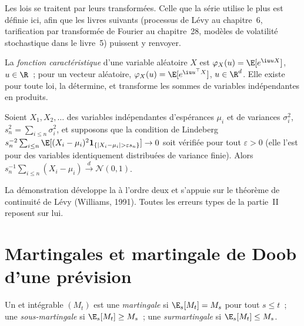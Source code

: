 Les lois se traitent par leurs transformées. Celle que la série utilise le plus est définie ici, afin
que les livres suivants (processus de Lévy au chapitre~6, tarification par transformée de Fourier au chapitre~28, modèles de volatilité
stochastique dans le livre~5) puissent y renvoyer.

\begin{definition}\label{def:qm:probability-at-speed:charfn}
La \emph{fonction caractéristique} d'une variable aléatoire $X$
est $\varphi_X(u) = \E[e^{\iu uX}]$, $u \in \R$~; pour un vecteur aléatoire, $\varphi_X(u) =
\E[e^{\iu u^\top X}]$, $u \in \R^d$. Elle existe pour toute loi, la détermine, et transforme les sommes
de variables indépendantes en produits.
\end{definition}

\begin{theorem}\label{thm:qm:probability-at-speed:clt}
Soient $X_1, X_2, \dots$ des variables indépendantes d'espérances $\mu_i$ et de variances $\sigma_i^2$, $s_n^2 =
\sum_{i \le n}\sigma_i^2$, et supposons que la condition de Lindeberg $s_n^{-2}\sum_{i\le n}\E[(X_i -
\mu_i)^2\mathbf 1_{\{|X_i - \mu_i| > \varepsilon s_n\}}] \to 0$ soit vérifiée pour tout $\varepsilon >
0$ (elle l'est pour des variables identiquement distribuées de variance finie). Alors
$s_n^{-1}\sum_{i \le n}(X_i - \mu_i) \xrightarrow{d} \mathcal N(0, 1)$.
\end{theorem}

\admitted

La démonstration développe la  à l'ordre deux et s'appuie sur le
théorème de continuité de Lévy (Williams, 1991). Toutes les erreurs types de la partie~II reposent sur lui.

\section{Martingales et martingale de Doob d'une prévision}

\begin{definition}[Martingale]\label{def:qm:probability-at-speed:martingale}
Un  et intégrable $(M_t)$ est une \emph{martingale} si
$\E_s[M_t] = M_s$ pour tout $s \le t$~; une \emph{sous-martingale} si
$\E_s[M_t] \ge M_s$~; une \emph{surmartingale} si $\E_s[M_t] \le
M_s$.
\end{definition}

